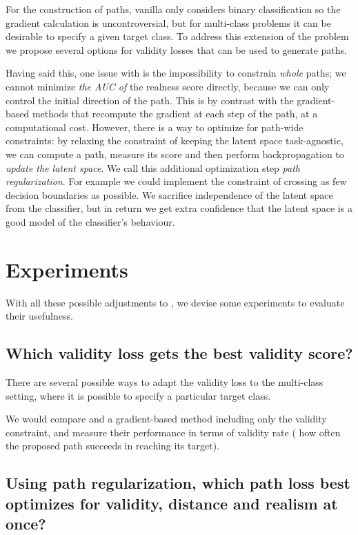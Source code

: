 \documentclass[../main.tex]{subfiles}
\begin{document}
For the construction of paths, vanilla \ls{} only considers binary classification so the gradient calculation is uncontroversial, but for multi-class problems it can be desirable to specify a given target class.
To address this extension of the problem we propose several options for validity losses that can be used to generate paths.

Having said this, one issue with \ls{} is the impossibility to constrain \emph{whole} paths; \eg{} we cannot minimize \emph{the AUC of} the realness score directly, because we can only control the initial direction of the path. This is by contrast with the gradient-based methods that recompute the gradient at each step of the path, at a computational cost. 
However, there is a way to optimize for path-wide constraints:
by relaxing the constraint of keeping the latent space task-agnostic, we can compute a path, measure its score and then perform backpropagation to \emph{update the latent space}. We call this additional optimization step \emph{path regularization}.
For example we could implement the constraint of crossing as few decision boundaries as possible.
We sacrifice independence of the latent space from the classifier, but in return we get extra confidence that the latent space is a good model of the classifier's behaviour.

\section{Experiments}

With all these possible adjustments to \ls{}, we devise some experiments to evaluate their usefulness.

\subsection{Which validity loss gets the best validity score?}

There are several possible ways to adapt the \ls{} validity loss to the multi-class setting, where it is possible to specify a particular target class.

We would compare \ls{} and a gradient-based method including only the validity constraint, and measure their performance in terms of validity rate (\ie{} how often the proposed path succeeds in reaching its target).

\subsection{Using path regularization, which path loss best optimizes for validity, distance and realism at once?}
\end{document}

